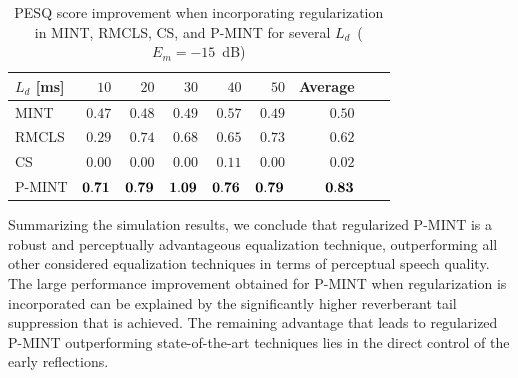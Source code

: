 \documentclass[10pt]{IEEEtran}
\begin{document}
\begin{table}[t!]
\centering
\caption{PESQ score improvement when incorporating regularization in MINT, RMCLS, CS, and P-MINT for several $L_d$~($E_m = -15$~dB)}
\label{tbl: pesq2}
\begin{tabular}{|l|r|r|r|r|r|r|r|r|}
\hline
$L_d$ [ms] & $10$ & $20$ & $30$ & $40$ & $50$ & Average  \\
\hline
MINT & $0.47$ & $0.48$ & $0.49$ & $0.57$ & $0.49$ & $0.50$ \\
\hline
RMCLS & $0.29$ & $0.74$ & $0.68$ & $0.65$ & $0.73$ & $0.62$ \\
\hline
CS & $0.00$ & $0.00$ & $0.00$ & $0.11$ & $0.00$ & $0.02$ \\
\hline
P-MINT & $\bf{0.71}$ & $\bf{0.79}$ & $\bf{1.09}$ & $\bf{0.76}$ & $\bf{0.79}$ & $\bf{0.83}$ \\
\hline
\end{tabular}
\end{table}

Summarizing the simulation results, we conclude that regularized P-MINT is a robust and perceptually advantageous equalization technique, outperforming all other considered equalization techniques in terms of perceptual speech quality.
The large performance improvement obtained for P-MINT when regularization is incorporated can be explained by the significantly higher reverberant tail suppression that is achieved.
The remaining advantage that leads to regularized P-MINT outperforming state-of-the-art techniques lies in the direct control of the early reflections. 
\end{document}
